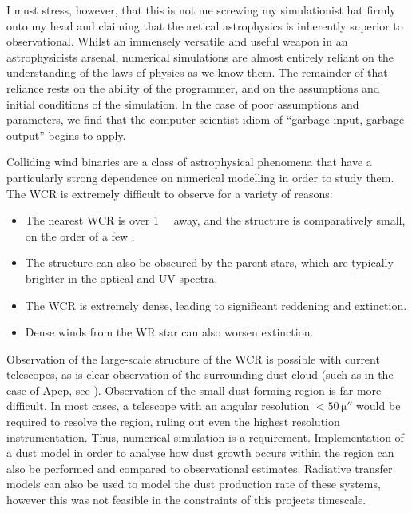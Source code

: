 I must stress, however, that this is not me screwing my simulationist hat firmly onto my head and claiming that theoretical astrophysics is inherently superior to observational.
Whilst an immensely versatile and useful weapon in an astrophysicists arsenal, numerical simulations are almost entirely reliant on the understanding of the laws of physics as we know them.
The remainder of that reliance rests on the ability of the programmer, and on the assumptions and initial conditions of the simulation.
In the case of poor assumptions and parameters, we find that the computer scientist idiom of ``garbage input, garbage output'' begins to apply.


Colliding wind binaries are a class of astrophysical phenomena that have a particularly strong dependence on numerical modelling in order to study them.
The WCR is extremely difficult to observe for a variety of reasons:

\begin{itemize}
  \item The nearest WCR is over \SI{1}{\kilo\parsec} away, and the structure is comparatively small, on the order of a few \si{\au}.
  \item The structure can also be obscured by the parent stars, which are typically brighter in the optical and UV spectra.
  \item The WCR is extremely dense, leading to significant reddening and extinction.
  \item Dense winds from the WR star can also worsen extinction.
\end{itemize}

\noindent
Observation of the large-scale structure of the WCR is possible with current telescopes, as is clear observation of the surrounding dust cloud (such as in the case of Apep, see \cite{callinghamAnisotropicWindsWolf2019}).
Observation of the small dust forming region is far more difficult.
In most cases, a telescope with an angular resolution $<50\,\si{\micro\arcsecond}$ would be required to resolve the region, ruling out even the highest resolution instrumentation.
Thus, numerical simulation is a requirement.
Implementation of a dust model in order to analyse how dust growth occurs within the region can also be performed and compared to observational estimates.
Radiative transfer models can also be used to model the dust production rate of these systems, however this was not feasible in the constraints of this projects timescale.

